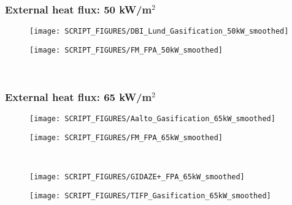 \newpage
\subsubsection{External heat flux: 50 kW/m$^2$}
\begin{minipage}{0.5\textwidth}
\begin{figure}[H]
{\texttt{[image: SCRIPT\_FIGURES/DBI\_Lund\_Gasification\_50kW\_smoothed]}}\\
\end{figure}
\end{minipage}
\begin{minipage}{0.35\textwidth}
\begin{figure}[H]
{\texttt{[image: SCRIPT\_FIGURES/FM\_FPA\_50kW\_smoothed]}}\\
\end{figure}
\end{minipage}\\
\vfill

\subsubsection{External heat flux: 65 kW/m$^2$}
\begin{minipage}{0.5\textwidth}
\begin{figure}[H]
{\texttt{[image: SCRIPT\_FIGURES/Aalto\_Gasification\_65kW\_smoothed]}}\\
\end{figure}
\end{minipage}
\begin{minipage}{0.35\textwidth}
\begin{figure}[H]
{\texttt{[image: SCRIPT\_FIGURES/FM\_FPA\_65kW\_smoothed]}}\\
\end{figure}
\end{minipage}\\
\begin{minipage}{0.5\textwidth}
\begin{figure}[H]
{\texttt{[image: SCRIPT\_FIGURES/GIDAZE+\_FPA\_65kW\_smoothed]}}\\
\end{figure}
\end{minipage}
\begin{minipage}{0.35\textwidth}
\begin{figure}[H]
{\texttt{[image: SCRIPT\_FIGURES/TIFP\_Gasification\_65kW\_smoothed]}}\\
\end{figure}
\end{minipage}\\
\vfill


